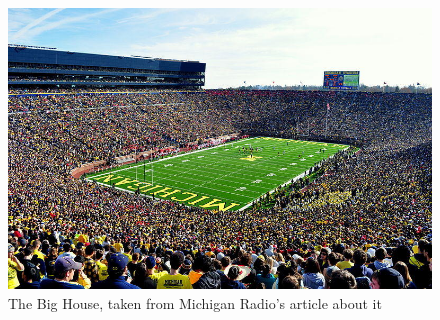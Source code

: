 \begin{figure}
    \centering
    \includegraphics{chapters/figures/the_big_house.jpeg}
    \caption{The Big House, taken from Michigan Radio's article about it \cite{the_big_house}}
    \label{fig:the_big_house}
\end{figure}

\blindtext[3]